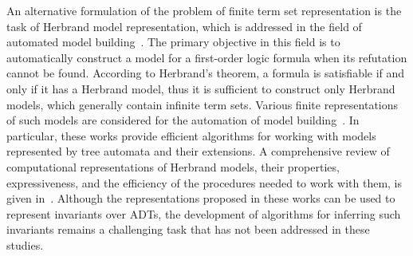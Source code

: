 An alternative formulation of the problem of finite term set representation is the task of Herbrand model representation, which is addressed in the field of automated model building~\cite{caferra2013automated}. The primary objective in this field is to automatically construct a model for a first-order logic formula when its refutation cannot be found. According to Herbrand's theorem, a formula is satisfiable if and only if it has a Herbrand model, thus it is sufficient to construct only Herbrand models, which generally contain infinite term sets. Various finite representations of such models are considered for the automation of model building~\cite{fermuller2007model,fermuller2005model,teucke2019expressivity,gramlich2002algorithmic}. In particular, these works provide efficient algorithms for working with models represented by tree automata and their extensions. A comprehensive review of computational representations of Herbrand models, their properties, expressiveness, and the efficiency of the procedures needed to work with them, is given in~\cite{matzinger1998computational, matzinger2000computational}. Although the representations proposed in these works can be used to represent invariants over ADTs, the development of algorithms for inferring such invariants remains a challenging task that has not been addressed in these studies.

